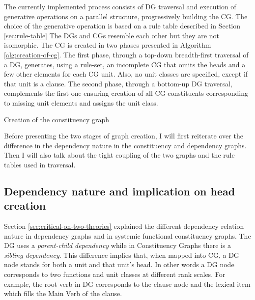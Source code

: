     The currently implemented process consists of DG traversal and execution of generative operations on a parallel structure, progressively building the CG. The choice of the generative operation is based on a rule table described in Section \ref{sec:rule-table} The DGs and CGs resemble each other but they are not isomorphic. The CG is created in two phases presented in Algorithm \ref{alg:creation-of-cg}. The first phase, through a top-down breadth-first traversal of a DG, generates, using a rule-set, an incomplete CG that omits the heads and a few other elements for each CG unit. Also, no unit classes are specified, except if that unit is a clause. The second phase, through a bottom-up DG traversal, complements the first one ensuring creation of all CG constituents corresponding to missing unit elements and assigns the unit class. 

    \begin{algorithm}[!ht]
    	\caption{Creation of the constituency graph}
    	\label{alg:creation-of-cg}
    \end{algorithm}

    Before presenting the two stages of graph creation, I will first reiterate over the difference in the dependency nature in the constituency and dependency graphs. Then I will also talk about the tight coupling of the two graphs and the rule tables used in traversal. 

\subsection{Dependency nature and implication on head creation}
\label{sec:dep-implications}
    Section \ref{sec:critical-on-two-theories} explained the different dependency relation nature in dependency graphs and in systemic functional constituency graphs. The DG uses a \textit{parent-child dependency} while in Constituency Graphs there is a \textit{sibling dependency}. This difference implies that, when mapped into CG, a DG node stands for both a unit and that unit's head. In other words a DG node corresponds to two functions and unit classes at different rank scales. For example, the root verb in DG corresponds to the clause node and the lexical item which fills the Main Verb of the clause. 

